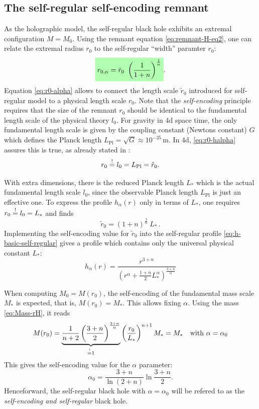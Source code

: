 \documentclass[12pt,a4paper]{report}
\numberwithin{equation}{chapter}
\newcommand{\highlight}[1]{%
  \colorbox{green!30}{$\displaystyle#1$}}
\begin{document}
\subsection{The self-regular self-encoding remnant}
As the holographic model, the self-regular black hole exhibits an extremal configuration $M=M_0$. Using the remnant equation \eqref{eq:remnant-H-eq2}, one can relate the extremal radius $r_0$ to the self-regular ``width'' paramter $r_0$:
%
\begin{equation}
\label{eq:r0-alpha}
\highlight{r_{0,\alpha} = \tilde r_0~\left( \frac 1{1+n} \right)^{\frac 1\alpha}}.
\end{equation}
Equation \eqref{eq:r0-alpha} allows to connect the length scale $\tilde r_0$ introduced for self-regular model to a physical length scale $r_0$. Note that the \emph{self-encoding} principle requires that the size of the remnant $r_0$ should be identical to the fundamental length scale of the physical theory $l_0$. For gravity in 4d space time, the only fundamental length scale is given by the coupling constant (Newtons constant) $G$ which defines the Planck length $L_\text{Pl} = \sqrt{G} \approx 10^{-35}\,$m. In 4d, \eqref{eq:r0-halpha} assures this is true, as already stated in \cite{NS2013}:
\begin{equation}
r_0 \stackrel{!}{=} l_0 = L_\text{Pl} = \tilde r_0.
\end{equation}
%

With extra dimensions, there is the reduced Planck length $L_*$ which is the actual fundamental length scale $l_0$, since the observable Planck length $L_\text{Pl}$ is just an effective one. To express the profile $h_\alpha(r)$ only in terms of $L_*$, one requires $r_0 \stackrel{!}{=} l_0 = L_*$ and finds
%
\begin{equation}
\label{eq:rtilde0-alpha}
\tilde r_0 = (1+n)^{\frac 1\alpha}~L_*
\,.
\end{equation}
%
Implementing the self-encoding value for $\tilde r_0$ into the self-regular profile \eqref{eq:h-basic-self-regular} gives a profile which contains only the universal physical constant $L_*$:
\begin{equation}\label{eq:halpha-fundamental}
h_\alpha(r) = \frac{r^{3+n}}{
\left( r^\alpha + \frac{1+n}2 L_*^\alpha \right)^{\frac{3+n}\alpha}
}
\end{equation}

When computing $M_0 = M(r_0)$, the self-encoding of the fundamental mass scale $M_*$ is expected, that is, $M(r_0) = M_*$.  This allows fixing $\alpha$. Using the mass \eqref{eq:Mass-rH}, it reads
\begin{equation}
M(r_0) =\underbrace{\frac{1}{n+2} \left( \frac{3+n}{2} \right)^{\frac{3+n}{\alpha}}
}_{ \stackrel{!}{=} 1}
\left( \frac{r_0}{L_*} \right)^{n+1} M_* = M_*
\quad \text{with~} \alpha=\alpha_0
\end{equation}
This gives the self-encoding value for the $\alpha$ parameter:
%
\begin{equation}\label{eq:alpha0}
\alpha_0 = \frac {3+n}{\ln(2+n)} \ln \frac {3+n}2.
\end{equation}
Henceforward, the self-regular black hole with $\alpha=\alpha_0$ will be refered to as the \emph{self-encoding and self-regular} black hole.
\end{document}
